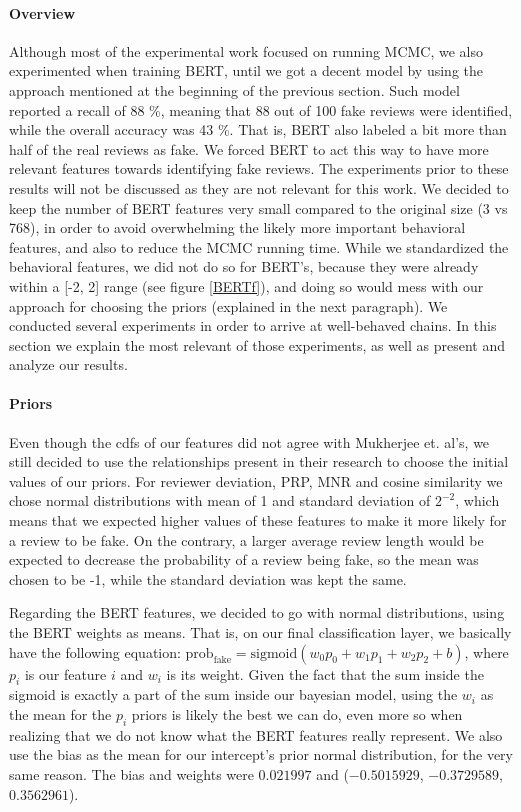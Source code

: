 \paragraph{Overview} Although most of the experimental work focused on running MCMC, we also experimented when training BERT, until we got a decent model by using the approach mentioned at the beginning of the previous section. Such model reported a recall of 88 \%, meaning that 88 out of 100 fake reviews were identified, while the overall accuracy was 43 \%. That is, BERT also labeled a bit more than half of the real reviews as fake. We forced BERT to act this way to have more relevant features towards identifying fake reviews. The experiments prior to these results will not be discussed as they are not relevant for this work. We decided to keep the number of BERT features very small compared to the original size (3 vs 768), in order to avoid overwhelming the likely more important behavioral features, and also to reduce the MCMC running time. While we standardized the behavioral features, we did not do so for BERT's, because they were already within a [-2, 2] range (see figure \ref{BERTf}), and doing so would mess with our approach for choosing the priors (explained in the next paragraph). We conducted several experiments in order to arrive at well-behaved chains. In this section we explain the most relevant of those experiments, as well as present and analyze our results. 

\vspace{2mm}

\paragraph{Priors} Even though the cdfs of our features did not agree with Mukherjee et. al's, we still decided to use the relationships present in their research to choose the initial values of our priors. For reviewer deviation, PRP, MNR and cosine similarity we chose normal distributions with mean of 1 and standard deviation of $2^{-2}$, which means that we expected higher values of these features to make it more likely for a review to be fake. On the contrary, a larger average review length would be expected to decrease the probability of a review being fake, so the mean was chosen to be -1, while the standard deviation was kept the same.

Regarding the BERT features, we decided to go with normal distributions, using the BERT weights as means. That is, on our final classification layer, we basically have the following equation: $\text{prob}_{\text{fake}} = \text{sigmoid} (w_0 p_0 + w_1 p_1 + w_2 p_2 + b)$, where $p_i$ is our feature $i$ and $w_i$ is its weight. Given the fact that the sum inside the sigmoid is exactly a part of the sum inside our bayesian model, using the $w_i$ as the mean for the $p_i$ priors is likely the best we can do, even more so when realizing that we do not know what the BERT features really represent. We also use the bias as the mean for our intercept's prior normal distribution, for the very same reason. The bias and weights were $0.021997$ and ($-0.5015929$, $-0.3729589$, $0.3562961$). 

